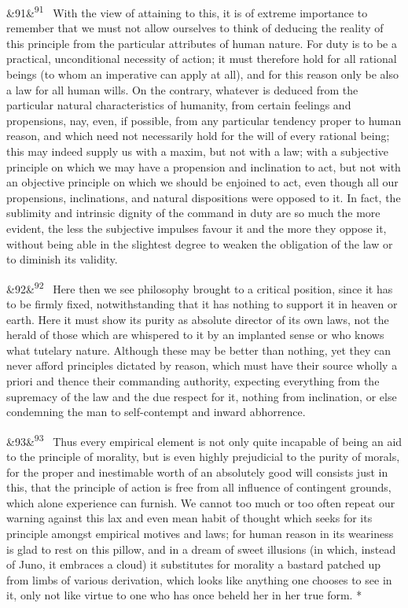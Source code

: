 \documentclass[12pt]{article}
\newcommand{\para}[1][]{\par\noindent\ifx&#1&\else\textsuperscript{\footnotesize #1}~\fi}
\begin{document}
\para[91] With the view of attaining to this, it is of extreme importance to remember that we must not allow ourselves to think of deducing the reality of this principle from the particular attributes of human nature. For duty is to be a practical, unconditional necessity of action; it must therefore hold for all rational beings (to whom an imperative can apply at all), and for this reason only be also a law for all human wills. On the contrary, whatever is deduced from the particular natural characteristics of humanity, from certain feelings and propensions, nay, even, if possible, from any particular tendency proper to human reason, and which need not necessarily hold for the will of every rational being; this may indeed supply us with a maxim, but not with a law; with a subjective principle on which we may have a propension and inclination to act, but not with an objective principle on which we should be enjoined to act, even though all our propensions, inclinations, and natural dispositions were opposed to it. In fact, the sublimity and intrinsic dignity of the command in duty are so much the more evident, the less the subjective impulses favour it and the more they oppose it, without being able in the slightest degree to weaken the obligation of the law or to diminish its validity.

\para[92] Here then we see philosophy brought to a critical position, since it has to be firmly fixed, notwithstanding that it has nothing to support it in heaven or earth. Here it must show its purity as absolute director of its own laws, not the herald of those which are whispered to it by an implanted sense or who knows what tutelary nature. Although these may be better than nothing, yet they can never afford principles dictated by reason, which must have their source wholly a priori and thence their commanding authority, expecting everything from the supremacy of the law and the due respect for it, nothing from inclination, or else condemning the man to self-contempt and inward abhorrence.

\para[93] Thus every empirical element is not only quite incapable of being an aid to the principle of morality, but is even highly prejudicial to the purity of morals, for the proper and inestimable worth of an absolutely good will consists just in this, that the principle of action is free from all influence of contingent grounds, which alone experience can furnish. We cannot too much or too often repeat our warning against this lax and even mean habit of thought which seeks for its principle amongst empirical motives and laws; for human reason in its weariness is glad to rest on this pillow, and in a dream of sweet illusions (in which, instead of Juno, it embraces a cloud) it substitutes for morality a bastard patched up from limbs of various derivation, which looks like anything one chooses to see in it, only not like virtue to one who has once beheld her in her true form. *
\end{document}
